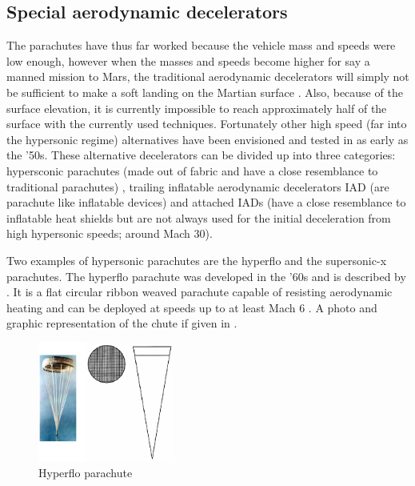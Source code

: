 \subsection{Special aerodynamic decelerators}
\label{subsec:specaerodec}
The parachutes have thus far worked because the vehicle mass and speeds were low enough, however when the masses and speeds become higher for say a manned mission to Mars, the traditional aerodynamic decelerators will simply not be sufficient to make a soft landing on the Martian surface \cite{nasafacts2013}. Also, because of the surface elevation, it is currently impossible to reach approximately half of the surface with the currently used techniques. Fortunately other high speed (far into the hypersonic regime) alternatives have been envisioned and tested in as early as the '50s. These alternative decelerators can be divided up into three categories: hypersconic parachutes (made out of fabric and have a close resemblance to traditional parachutes) \cite{lingard2005}, trailing inflatable aerodynamic decelerators \acs{IAD} (are parachute like inflatable devices) and attached \acs{IAD}s (have a close resemblance to      inflatable heat shields but are not always used for the initial deceleration from high hypersonic speeds; around Mach 30).

Two examples of hypersonic parachutes are the hyperflo and the supersonic-x parachutes. The hyperflo parachute was developed in the '60s and is described by \cite{pepper1968}. It is a flat circular ribbon weaved parachute capable of resisting aerodynamic heating and can be deployed at speeds up to at least Mach 6 \cite{lingard2005}. A photo and graphic representation of the chute if given in .

\begin{figure}[!ht]
\centering
\includegraphics[width=0.4\textwidth]{figures/entry_descent/hyperflo_lingard2005.jpg}
\caption{Hyperflo parachute \cite{lingard2005}}
\label{fig:hyperflo_lingard2005}
\end{figure}   

